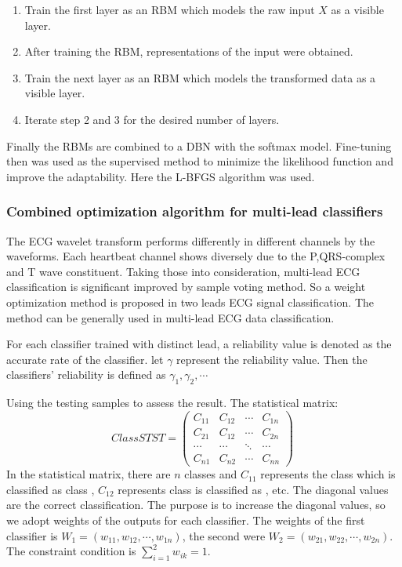 \documentclass[graybox]{svmult}
\begin{document}
\begin{enumerate}
\item Train the first layer as an RBM which models the raw input $X$ as a visible layer.
\item After training the RBM, representations of the input were obtained.
\item Train the next layer as an RBM which models the transformed data as a visible layer.
\item Iterate step 2 and 3 for the desired number of layers.
\end{enumerate}

Finally the RBMs are combined to a DBN with the softmax model. Fine-tuning then was used as the supervised method to minimize the likelihood function and improve the adaptability. Here the L-BFGS algorithm\citep{liu1989limited, andrew2007scalable} was used.

\subsubsection{Combined optimization algorithm for multi-lead classifiers}
The ECG wavelet transform performs differently in different channels by the waveforms. Each heartbeat channel shows diversely due to the P,QRS-complex and T wave constituent. 
Taking those into consideration, multi-lead ECG classification is significant improved by sample voting method. So a weight optimization method is proposed in two leads ECG signal classification. 
The method can be generally used in multi-lead ECG data classification. 

For each classifier trained with distinct lead, a reliability value is denoted as the accurate rate of the classifier. let $\gamma$ represent the reliability value. Then the classifiers' reliability is defined as $\gamma_1, \gamma_2, \cdots$

Using the testing samples to assess the result. The statistical matrix:
\begin{equation}
ClassSTST = \left(
\begin{array}{cccc}
 C_{11} & C_{12} & \cdots & C_{1n}\\
 C_{21} & C_{12} & \cdots & C_{2n}\\
 \cdots & \cdots & \ddots & \cdots\\
 C_{n1} & C_{n2} & \cdots & C_{nn}
\end{array}
\right)~
\end{equation}
In the statistical matrix, there are $n$ classes and $C_{11}$ represents the class \uppercase\expandafter{} which is classified as class \uppercase\expandafter{}, $C_{12}$ represents class \uppercase\expandafter{} is classified as \uppercase\expandafter{}, etc. 
The diagonal values are the correct classification. The purpose is to increase the diagonal values, so we adopt weights of the outputs for each classifier. 
The weights of the first classifier is $W_1 = (w_{11}, w_{12}, \cdots, w_{1n})$, the second were $W_2 = (w_{21}, w_{22}, \cdots, w_{2n})$. The constraint condition is $\sum\nolimits_{i=1}^2{w_{ik}} = 1$. 
\end{document}
